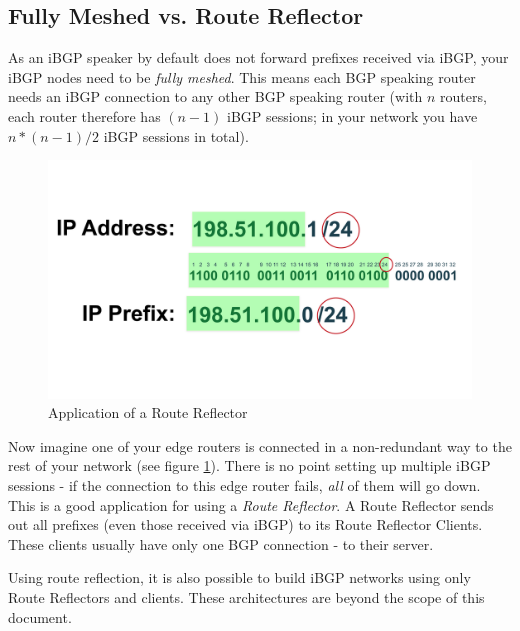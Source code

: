 \subsection{Fully Meshed vs. Route Reflector}
\label{routereflector}
As an iBGP speaker by default does not forward prefixes received via iBGP, your iBGP nodes need to be \emph{fully meshed}. This means each BGP speaking router needs an iBGP connection to any other BGP speaking router (with $n$ routers, each router therefore has $(n-1)$ iBGP sessions; in your network you have $n*(n-1)/2$ iBGP sessions in total).

\begin{figure}
  \centering
  \includegraphics[width=\linewidth,page=12]{img/Drawings.pdf}
  \caption{Application of a Route Reflector}
  \label{fig:routereflector}
\end{figure}

Now imagine one of your edge routers is connected in a non-redundant way to the rest of your network (see figure \ref{fig:routereflector}). There is no point setting up multiple iBGP sessions - if the connection to this edge router fails, \emph{all} of them will go down. This is a good application for using a \emph{Route Reflector}. A \gls{Route Reflector} sends out all prefixes (even those received via iBGP) to its \glspl{Route Reflector Client}. These clients usually have only one BGP connection - to their server.

Using route reflection, it is also possible to build iBGP networks using only Route Reflectors and clients. These architectures are beyond the scope of this document.


